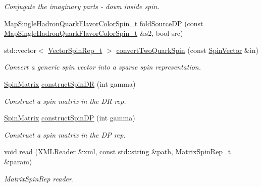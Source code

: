 \begin{DoxyCompactItemize}
\begin{DoxyCompactList}\small\item\em Conjugate the imaginary parts -\/ down inside spin. \end{DoxyCompactList}\item 
\mbox{\hyperlink{namespaceHadron_a03b319764f85c20434f20a269ce5f388}{Map\+Single\+Hadron\+Quark\+Flavor\+Color\+Spin\+\_\+t}} \mbox{\hyperlink{namespaceHadron_a273b8ceda53ab61615d67cead7c42d94}{fold\+Source\+DP}} (const \mbox{\hyperlink{namespaceHadron_a03b319764f85c20434f20a269ce5f388}{Map\+Single\+Hadron\+Quark\+Flavor\+Color\+Spin\+\_\+t}} \&s2, bool src)
\item 
std\+::vector$<$ \mbox{\hyperlink{structHadron_1_1VectorSpinRep__t}{Vector\+Spin\+Rep\+\_\+t}} $>$ \mbox{\hyperlink{namespaceHadron_a87528a5f45980257a1473a3f77301a5b}{convert\+Two\+Quark\+Spin}} (const \mbox{\hyperlink{group__defs_ga4cb5c4207c68050d0bd3e3e2d614bc78}{Spin\+Vector}} \&in)
\begin{DoxyCompactList}\small\item\em Convert a generic spin vector into a sparse spin representation. \end{DoxyCompactList}\item 
\mbox{\hyperlink{group__defs_gad066768e154e358a7f3c0708c774be29}{Spin\+Matrix}} \mbox{\hyperlink{namespaceHadron_add425eaa856f87203aaf3bd1e3eb086d}{construct\+Spin\+DR}} (int gamma)
\begin{DoxyCompactList}\small\item\em Construct a spin matrix in the DR rep. \end{DoxyCompactList}\item 
\mbox{\hyperlink{group__defs_gad066768e154e358a7f3c0708c774be29}{Spin\+Matrix}} \mbox{\hyperlink{namespaceHadron_af2328410f9a0a7191a4d319284425fed}{construct\+Spin\+DP}} (int gamma)
\begin{DoxyCompactList}\small\item\em Construct a spin matrix in the DP rep. \end{DoxyCompactList}\item 
void \mbox{\hyperlink{namespaceHadron_ad46ef728c9d609cbf63217c66bdf0285}{read}} (\mbox{\hyperlink{classADATXML_1_1XMLReader}{X\+M\+L\+Reader}} \&xml, const std\+::string \&path, \mbox{\hyperlink{structHadron_1_1MatrixSpinRep__t}{Matrix\+Spin\+Rep\+\_\+t}} \&param)
\begin{DoxyCompactList}\small\item\em Matrix\+Spin\+Rep reader. \end{DoxyCompactList}\item 

\end{DoxyCompactItemize}
